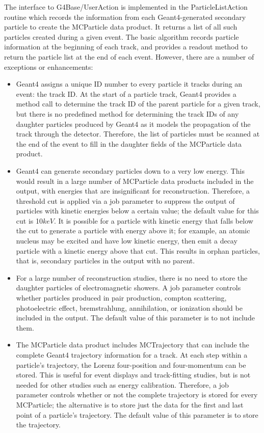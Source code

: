 \documentclass[12pt]{elsarticle}
\begin{document}
The interface to G4Base/UserAction is implemented in the ParticleListAction routine 
which records the
information from each Geant4-generated secondary particle to create
the MCParticle data product. It returns a list of all such particles
created during a given event.
The basic algorithm records particle
information at the beginning of each track, and provides a readout
method to return the particle list at the end of each event. However,
there are a number of exceptions or enhancements:

\begin{itemize}

\item Geant4 assigns a unique ID number to every particle it tracks
  during an event: the track ID. At the start of a particle track,
  Geant4 provides a method call to determine the track ID of the
  parent particle for a given track, but there is no predefined method
  for determining the track IDs of any daughter particles produced by
  Geant4 as it models the propagation of the track through the
  detector. Therefore, the list of particles must be scanned at the
  end of the event to fill in the daughter fields of the MCParticle
  data product.

\item Geant4 can generate secondary particles down to a very low
  energy. This would result in a large number of MCParticle data
  products included in the output, with energies that are
  insignificant for reconstruction. Therefore, a threshold cut is
  applied via a job parameter to suppress the output of particles with
  kinetic energies below a certain value; the default value for this
  cut is 10$keV$. It is possible for a particle with kinetic
  energy that falls below the cut to generate a particle with energy
  above it; for example, an atomic nucleus may be excited and have low
  kinetic energy, then emit a decay particle with a kinetic energy
  above that cut. This results in orphan particles, that is,
  secondary particles in the output with no parent. 

\item For a large number of reconstruction studies, there is no need
  to store the daughter particles of electromagnetic showers. A job
  parameter controls whether particles produced in pair production,
  compton scattering, photoelectric effect, bremstrahlung,
  annihilation, or ionization should be included in the output. The
  default value of this parameter is to not include them. 

\item The MCParticle data product includes MCTrajectory that can include the complete Geant4 trajectory
  information for a track. At each step within a particle's
  trajectory, the Lorenz four-position and four-momentum can be
  stored. This is useful for event displays and track-fitting studies,
  but is not needed for other studies such as energy
  calibration. Therefore, a job parameter controls whether or not the
  complete trajectory is stored for every MCParticle; the
  alternative is to store just the data for the first and last point
  of a particle's trajectory. The default value of this parameter is
  to store the trajectory.


\end{itemize}
\end{document}
